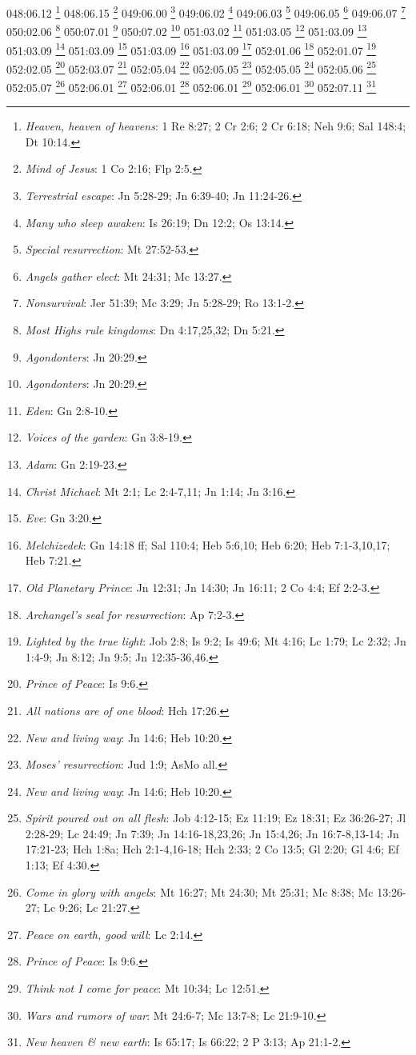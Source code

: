 048:06.12 \footnote{\textit{Heaven, heaven of heavens}: 1 Re 8:27; 2 Cr 2:6; 2 Cr 6:18; Neh 9:6; Sal 148:4; Dt 10:14.}
048:06.15 \footnote{\textit{Mind of Jesus}: 1 Co 2:16; Flp 2:5.}
049:06.00 \footnote{\textit{Terrestrial escape}: Jn 5:28-29; Jn 6:39-40; Jn 11:24-26.}
049:06.02 \footnote{\textit{Many who sleep awaken}: Is 26:19; Dn 12:2; Os 13:14.}
049:06.03 \footnote{\textit{Special resurrection}: Mt 27:52-53.}
049:06.05 \footnote{\textit{Angels gather elect}: Mt 24:31; Mc 13:27.}
049:06.07 \footnote{\textit{Nonsurvival}: Jer 51:39; Mc 3:29; Jn 5:28-29; Ro 13:1-2.}
050:02.06 \footnote{\textit{Most Highs rule kingdoms}: Dn 4:17,25,32; Dn 5:21.}
050:07.01 \footnote{\textit{Agondonters}: Jn 20:29.}
050:07.02 \footnote{\textit{Agondonters}: Jn 20:29.}
051:03.02 \footnote{\textit{Eden}: Gn 2:8-10.}
051:03.05 \footnote{\textit{Voices of the garden}: Gn 3:8-19.}
051:03.09 \footnote{\textit{Adam}: Gn 2:19-23.}
051:03.09 \footnote{\textit{Christ Michael}: Mt 2:1; Lc 2:4-7,11; Jn 1:14; Jn 3:16.}
051:03.09 \footnote{\textit{Eve}: Gn 3:20.}
051:03.09 \footnote{\textit{Melchizedek}: Gn 14:18 ff; Sal 110:4; Heb 5:6,10; Heb 6:20; Heb 7:1-3,10,17; Heb 7:21.}
051:03.09 \footnote{\textit{Old Planetary Prince}: Jn 12:31; Jn 14:30; Jn 16:11; 2 Co 4:4; Ef 2:2-3.}
052:01.06 \footnote{\textit{Archangel's seal for resurrection}: Ap 7:2-3.}
052:01.07 \footnote{\textit{Lighted by the true light}: Job 2:8; Is 9:2; Is 49:6; Mt 4:16; Lc 1:79; Lc 2:32; Jn 1:4-9; Jn 8:12; Jn 9:5; Jn 12:35-36,46.}
052:02.05 \footnote{\textit{Prince of Peace}: Is 9:6.}
052:03.07 \footnote{\textit{All nations are of one blood}: Hch 17:26.}
052:05.04 \footnote{\textit{New and living way}: Jn 14:6; Heb 10:20.}
052:05.05 \footnote{\textit{Moses' resurrection}: Jud 1:9; AsMo all.}
052:05.05 \footnote{\textit{New and living way}: Jn 14:6; Heb 10:20.}
052:05.06 \footnote{\textit{Spirit poured out on all flesh}: Job 4:12-15; Ez 11:19; Ez 18:31; Ez 36:26-27; Jl 2:28-29; Lc 24:49; Jn 7:39; Jn 14:16-18,23,26; Jn 15:4,26; Jn 16:7-8,13-14; Jn 17:21-23; Hch 1:8a; Hch 2:1-4,16-18; Hch 2:33; 2 Co 13:5; Gl 2:20; Gl 4:6; Ef 1:13; Ef 4:30.}
052:05.07 \footnote{\textit{Come in glory with angels}: Mt 16:27; Mt 24:30; Mt 25:31; Mc 8:38; Mc 13:26-27; Lc 9:26; Lc 21:27.}
052:06.01 \footnote{\textit{Peace on earth, good will}: Lc 2:14.}
052:06.01 \footnote{\textit{Prince of Peace}: Is 9:6.}
052:06.01 \footnote{\textit{Think not I come for peace}: Mt 10:34; Lc 12:51.}
052:06.01 \footnote{\textit{Wars and rumors of war}: Mt 24:6-7; Mc 13:7-8; Lc 21:9-10.}
052:07.11 \footnote{\textit{New heaven & new earth}: Is 65:17; Is 66:22; 2 P 3:13; Ap 21:1-2.}
